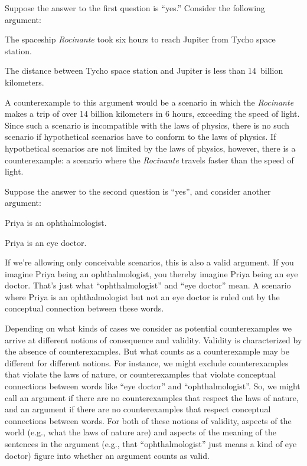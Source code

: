Suppose the answer to the first question is ``yes.'' Consider the following argument:
	\begin{earg}
		\item[] The spaceship \textit{Rocinante} took six hours to reach Jupiter from Tycho space station.
		\item[\texttherefore] The distance between Tycho space station and Jupiter is less than 14~billion kilometers.
	\end{earg}
A counterexample to this argument would be a scenario in which the \textit{Rocinante} makes a trip of over 14 billion kilometers in 6 hours, exceeding the speed of light. Since such a scenario is incompatible with the laws of physics, there is no such scenario if hypothetical scenarios have to conform to the laws of physics.  If hypothetical scenarios are not limited by the laws of physics, however, there is a counterexample: a scenario where the \textit{Rocinante} travels faster than the speed of light.

Suppose the answer to the second question is ``yes'', and consider another argument:
	\begin{earg}
		\item[] Priya is an ophthalmologist.
		\item[\texttherefore] Priya is an eye doctor.
	\end{earg}
If we're allowing only conceivable scenarios, this is also a valid argument. If you imagine Priya being an ophthalmologist, you thereby imagine Priya being an eye doctor. That's just what ``ophthalmologist'' and ``eye doctor'' mean.  A scenario where Priya is an ophthalmologist but not an eye doctor is ruled out by the conceptual connection between these words.

Depending on what kinds of cases we consider as potential
counterexamples we arrive at different notions of consequence and
validity. Validity is characterized by the absence of counterexamples.
But what counts as a counterexample may be different for different
notions. For instance, we might exclude counterexamples that violate
the laws of nature, or counterexamples that violate conceptual
connections between words like ``eye doctor'' and ``ophthalmologist''.
So, we might call an argument  if there
are no counterexamples that respect the laws of nature, and an
argument  if there are no counterexamples
that respect conceptual connections between words. For both of these
notions of validity, aspects of the world (e.g., what the laws of
nature are) and aspects of the meaning of the sentences in the
argument (e.g., that ``ophthalmologist'' just means a kind of eye
doctor) figure into whether an argument counts as valid.

